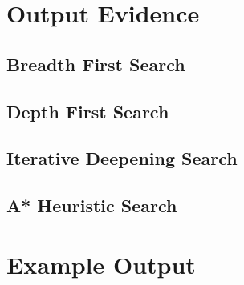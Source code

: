 \documentclass[a4paper]{article}
\begin{document}
\newpage
\begin{appendices}

  \section{Output Evidence}
  \subsection{Breadth First Search}
  \label{app:evidence-bfs}
  

  \subsection{Depth First Search}
  \label{app:evidence-dfs}
  

  \subsection{Iterative Deepening Search}
  \label{app:evidence-ids}
  

  \subsection{A* Heuristic Search}
  \label{app:evidence-a*}
  

  \section{Example Output}
\end{appendices}
\end{document}
